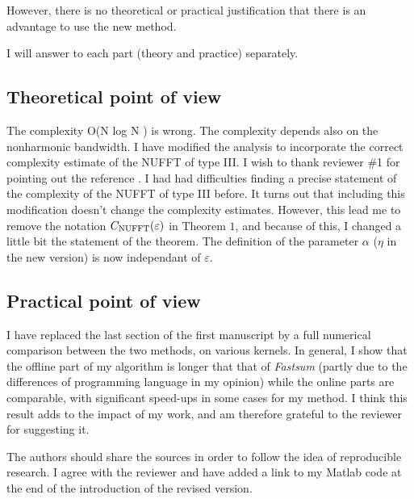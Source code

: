 \documentclass[10pt]{article}
\begin{document}
	\begin{response}{However, there is no theoretical or practical justification that there is an advantage to use the new method.}
	\end{response}	
	
	I will answer to each part (theory and practice) separately.
	
	\subsection*{Theoretical point of view}
	
	\begin{response}{The complexity O(N log N ) is wrong. The complexity depends also on the nonharmonic bandwidth.}
		I have modified the analysis to incorporate the correct complexity estimate of the NUFFT of type III. I wish to thank reviewer \#1 for pointing out the reference \cite{keiner2009using}. I had had difficulties finding a precise statement of the complexity of the NUFFT of type III before. It turns out that including this modification doesn't change the complexity estimates. However, this lead me to remove the notation $C_{\textup{NUFFT}}(\varepsilon)$ in Theorem $1$, and because of this, I changed a little bit the statement of the theorem. The definition of the parameter $\alpha$ ($\eta$ in the new version) is now independant of $\varepsilon$. 
	\end{response}
		
	\subsection*{Practical point of view}
	
	I have replaced the last section of the first manuscript by a full numerical comparison between the two methods, on various kernels. In general, I show that the offline part of my algorithm is longer that that of \textit{Fastsum} (partly due to the differences of programming language in my opinion) while the online parts are comparable, with significant speed-ups in some cases for my method. I think this result adds to the impact of my work, and am therefore grateful to the reviewer for suggesting it. 
	
	\begin{response}{The authors should share the sources in order to follow the idea of reproducible research.}
	I agree with the reviewer and have added a link to my Matlab code at the end of the introduction of the revised version.
	\end{response}
	
\end{document}
